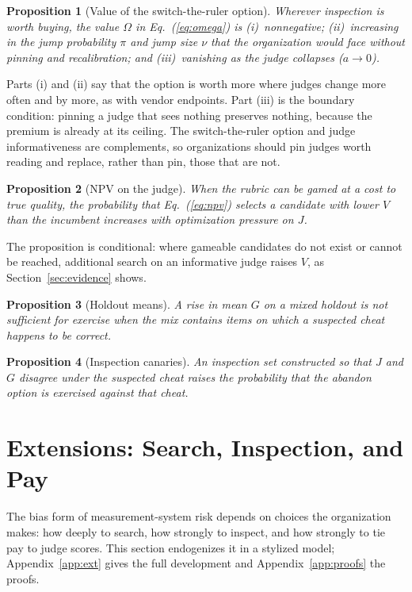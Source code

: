 \documentclass[acmsmall,screen,review]{acmart}
\newtheorem{proposition}{Proposition}
\theoremstyle{acmdefinition}
\begin{document}
\begin{proposition}[Value of the switch-the-ruler option]
Wherever inspection is worth buying, the value $\Omega$ in Eq.~(\ref{eq:omega}) is (i)~nonnegative; (ii)~increasing in the jump probability $\pi$ and jump size $\nu$ that the organization would face without pinning and recalibration; and (iii)~vanishing as the judge collapses ($a \to 0$).
\end{proposition}

Parts (i) and (ii) say that the option is worth more where judges change more often and by more, as with vendor endpoints. Part (iii) is the boundary condition: pinning a judge that sees nothing preserves nothing, because the premium is already at its ceiling. The switch-the-ruler option and judge informativeness are complements, so organizations should pin judges worth reading and replace, rather than pin, those that are not.

\begin{proposition}[NPV on the judge]
When the rubric can be gamed at a cost to true quality, the probability that Eq.~(\ref{eq:npv}) selects a candidate with lower $V$ than the incumbent increases with optimization pressure on $J$.
\end{proposition}

The proposition is conditional: where gameable candidates do not exist or cannot be reached, additional search on an informative judge raises $V$, as Section~\ref{sec:evidence} shows.

\begin{proposition}[Holdout means]
A rise in mean $G$ on a mixed holdout is not sufficient for exercise when the mix contains items on which a suspected cheat happens to be correct.
\end{proposition}

\begin{proposition}[Inspection canaries]
An inspection set constructed so that $J$ and $G$ disagree under the suspected cheat raises the probability that the abandon option is exercised against that cheat.
\end{proposition}

\section{Extensions: Search, Inspection, and Pay}\label{sec:ext}

The bias form of measurement-system risk depends on choices the organization makes: how deeply to search, how strongly to inspect, and how strongly to tie pay to judge scores. This section endogenizes it in a stylized model; Appendix~\ref{app:ext} gives the full development and Appendix~\ref{app:proofs} the proofs.
\end{document}
